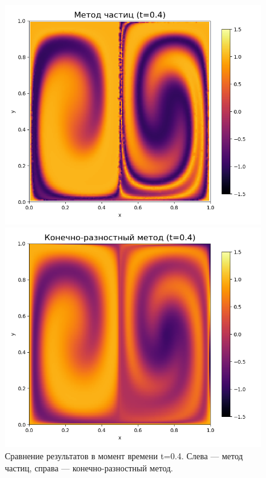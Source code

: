 \documentclass[a4paper,12pt]{article}
\begin{document}
\begin{figure}[H]
    \centering
    \begin{minipage}{0.49\textwidth}
        \centering
        \includegraphics[width=\linewidth]{comparison_results/particle_method_t_0.4.png}
    \end{minipage}
    \hfill
    \begin{minipage}{0.49\textwidth}
        \centering
        \includegraphics[width=\linewidth]{comparison_results/fdm_method_t_0.4.png}
    \end{minipage}
    \caption{Сравнение результатов в момент времени t=0.4. Слева — метод частиц, справа — конечно-разностный метод.}
    \label{fig:t04}
\end{figure}
\end{document}
